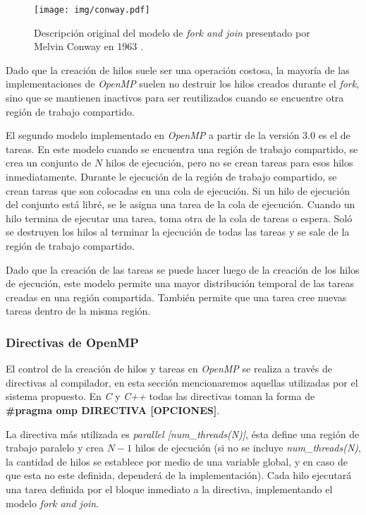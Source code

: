\begin{figure}[h]

	\centering

	\texttt{[image: img/conway.pdf]}

	\caption{Descripción original del modelo de \emph{fork and join}
	presentado por Melvin Conway en 1963 \cite{conway1963}.}

	\label{conway}

\end{figure}

Dado que la creación de hilos suele ser una operación costosa, la mayoría de las
implementaciones de \emph{OpenMP} suelen no destruir los hilos creados durante
el \emph{fork}, sino que se mantienen inactivos para ser reutilizados cuando se
encuentre otra región de trabajo compartido.

El segundo modelo implementado en \emph{OpenMP} a partir de la versión 3.0 es
el de tareas. En este modelo cuando se encuentra una región de trabajo
compartido, se crea un conjunto de $N$ hilos de ejecución, pero no se crean
tareas para esos hilos inmediatamente. Durante le ejecución de la región de
trabajo compartido, se crean tareas que son colocadas en una cola de ejecución.
Si un hilo de ejecución del conjunto está libré, se le asigna una tarea de la
cola de ejecución. Cuando un hilo termina de ejecutar una tarea, toma otra de la
cola de tareas o espera. Soló se destruyen los hilos al terminar la ejecución de
todas las tareas y se sale de la región de trabajo compartido.

Dado que la creación de las tareas se puede hacer luego de la creación de los
hilos de ejecución, este modelo permite una mayor distribución temporal de las
tareas creadas en una región compartida. También permite que una tarea cree
nuevas tareas dentro de la misma región.

\subsubsection{Directivas de OpenMP}

El control de la creación de hilos y tareas en \emph{OpenMP} se realiza a través
de directivas al compilador, en esta sección mencionaremos aquellas utilizadas
por el sistema propuesto. En \emph{C} y \emph{C++} todas las directivas toman la
forma de \textbf{\#pragma omp DIRECTIVA [OPCIONES]}.

La directiva más utilizada es \emph{parallel [num\_threads(N)]}, ésta define una
región de trabajo paralelo y crea $N-1$ hilos de ejecución (si no se incluye
\emph{num\_threads(N)}, la cantidad de hilos se establece por medio de una
variable global, y en caso de que esta no este definida, dependerá de la
implementación). Cada hilo ejecutará una tarea definida por el bloque inmediato
a la directiva, implementando el modelo \emph{fork and join}.

